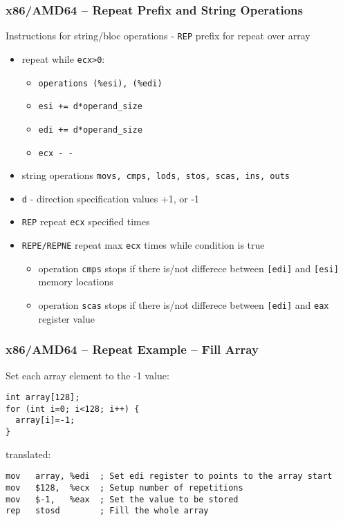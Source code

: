 \documentclass{beamer}
\begin{document}
\begin{frame}
\frametitle{x86/AMD64 -- Repeat Prefix and String Operations}
Instructions for string/bloc operations  - \texttt{REP} prefix for repeat over array
\begin{itemize}
\item repeat while \texttt{ecx>0}:
\begin{itemize}
\item \texttt{operations (\%esi), (\%edi)}
\item \texttt{esi += d*operand\_size}
\item \texttt{edi += d*operand\_size}
\item \texttt{ecx - -}
\end{itemize}
\item string operations \texttt{movs, cmps, lods, stos, scas, ins, outs}
\item \texttt{d} - direction specification values +1, or -1
\item \texttt{REP} repeat \texttt{ecx} specified times
\item \texttt{REPE/REPNE} repeat max \texttt{ecx} times while condition is true
  \begin{itemize}
  \item operation \texttt{cmps} stops if there is/not differece between \texttt{[edi]} and \texttt{[esi]} memory locations
  \item operation \texttt{scas} stops if there is/not differece between \texttt{[edi]} and \texttt{eax} register value
  \end{itemize}
\end{itemize}

\end{frame}


\begin{frame}[fragile]
\frametitle{x86/AMD64 -- Repeat Example -- Fill Array}
Set each array element to the -1 value:
\begin{verbatim}
int array[128];
for (int i=0; i<128; i++) {
  array[i]=-1;
}
\end{verbatim}
translated:
\begin{verbatim}
mov   array, %edi  ; Set edi register to points to the array start
mov   $128,  %ecx  ; Setup number of repetitions
mov   $-1,   %eax  ; Set the value to be stored
rep   stosd        ; Fill the whole array
\end{verbatim}
\end{frame}
\end{document}
